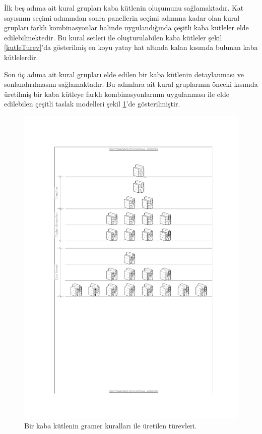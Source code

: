 \documentclass[12pt,turkish,a4paperpaper,]{report}
\begin{document}
İlk beş adıma ait kural grupları kaba kütlenin oluşumunu sağlamaktadır.
Kat sayısının seçimi adımından sonra panellerin seçimi adımına kadar
olan kural grupları farklı kombinasyonlar halinde uygulandığında çeşitli
kaba kütleler elde edilebilmektedir. Bu kural setleri ile
oluşturulabilen kaba kütleler şekil \ref{kutleTurev}'da gösterilmiş en
koyu yatay hat altında kalan kısımda bulunan kaba kütlelerdir.

Son üç adıma ait kural grupları elde edilen bir kaba kütlenin
detaylanması ve sonlandırılmasını sağlamaktadır. Bu adımlara ait kural
gruplarının önceki kısımda üretilmiş bir kaba kütleye farklı
kombinasyonlarının uygulanması ile elde edilebilen çeşitli taslak
modelleri şekil \ref{seciliTurev}'de gösterilmiştir.

\begin{figure}
\centering
\includegraphics[width=1\textwidth,height=\textheight]{source/figures/seciliTurevleri.pdf}
\caption{Bir kaba kütlenin gramer kuralları ile üretilen türevleri.
\label{seciliTurev}}
\end{figure}
\end{document}
